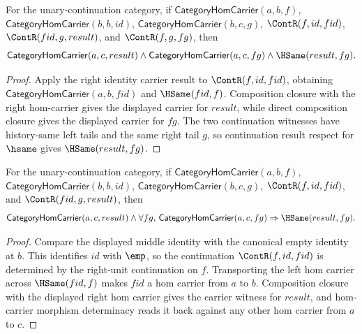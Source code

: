 \begin{theorem}
\label{thm:category-hom-carrier-comp-middle-identity-result}
For the unary-continuation category, if
$\mathsf{CategoryHomCarrier}(a,b,f)$,
$\mathsf{CategoryHomCarrier}(b,b,id)$,
$\mathsf{CategoryHomCarrier}(b,c,g)$,
$\ContR(f,id,fid)$, $\ContR(fid,g,result)$, and $\ContR(f,g,fg)$, then
$$
\mathsf{CategoryHomCarrier}(a,c,result)\wedge
\mathsf{CategoryHomCarrier}(a,c,fg)\wedge\HSame(result,fg).
$$
\end{theorem}
\begin{proof}
Apply the right identity carrier result to $\ContR(f,id,fid)$, obtaining
$\mathsf{CategoryHomCarrier}(a,b,fid)$ and $\HSame(fid,f)$. Composition
closure with the right hom-carrier gives the displayed carrier for $result$,
while direct composition closure gives the displayed carrier for $fg$.
The two continuation witnesses have history-same left tails and the same
right tail $g$, so continuation result respect for $\hsame$ gives
$\HSame(result,fg)$.
\end{proof}

\begin{theorem}
\label{thm:category-comp-middle-identity-public-readback}
For the unary-continuation category, if
$\mathsf{CategoryHomCarrier}(a,b,f)$,
$\mathsf{CategoryHomCarrier}(b,b,id)$,
$\mathsf{CategoryHomCarrier}(b,c,g)$,
$\ContR(f,id,fid)$, and $\ContR(fid,g,result)$, then
$$
\mathsf{CategoryHomCarrier}(a,c,result)\wedge
\forall fg,\,
\mathsf{CategoryHomCarrier}(a,c,fg)\Rightarrow\HSame(result,fg).
$$
\end{theorem}
\begin{proof}
Compare the displayed middle identity with the canonical empty identity at
$b$. This identifies $id$ with $\emp$, so the continuation
$\ContR(f,id,fid)$ is determined by the right-unit continuation on $f$.
Transporting the left hom carrier across $\HSame(fid,f)$ makes
$fid$ a hom carrier from $a$ to $b$. Composition closure with the displayed
right hom carrier gives the carrier witness for $result$, and hom-carrier
morphism determinacy reads it back against any other hom carrier from $a$ to
$c$.
\end{proof}

